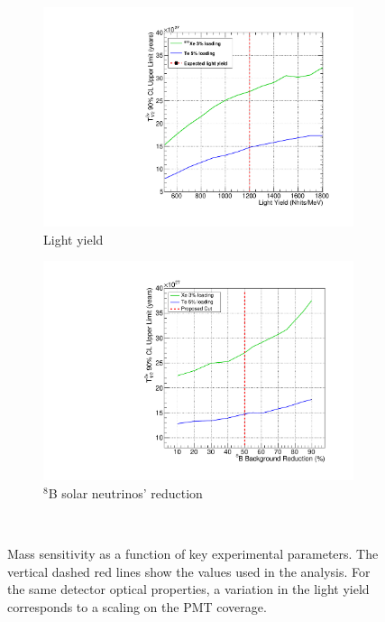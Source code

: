 \begin{figure}[!h]
\centering
\begin{subfigure}[b]{0.35\textwidth}
 \includegraphics[width=\textwidth]{dbd/ly_comparison_lifetime_500.pdf}
 \caption{Light yield}
 \label{fig:scale-ly}
\end{subfigure}
\begin{subfigure}[b]{0.35\textwidth}
 \includegraphics[width=\textwidth]{dbd/b8_reduction_fc.pdf}
 \caption{$^8$B solar neutrinos' reduction}
 \label{fig:scale-b8}
\end{subfigure}\\
\caption{Mass sensitivity as a function of key experimental parameters. The vertical dashed red lines show the values used in the analysis. For the same detector optical properties, a variation in the light yield corresponds to a scaling on the PMT coverage.}
\label{fig:scaling-plots}
\end{figure}

